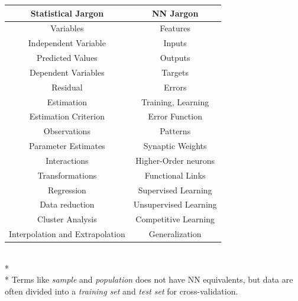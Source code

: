\documentclass[10pt,a4paper]{article}
\begin{document}
	\begin{tabular}{|c|c|}
		\hline 
		\textbf{Statistical Jargon} & \textbf{NN Jargon} \\ 
		\hline 
		Variables & Features \\ 
		\hline 
		Independent Variable & Inputs \\ 
		\hline 
		Predicted Values & Outputs \\ 
		\hline 
		Dependent Variables & Targets \\ 
		\hline 
		Residual & Errors \\ 
		\hline 
		Estimation & Training, Learning \\ 
		\hline 
		Estimation Criterion & Error Function \\ 
		\hline 
		Observations & Patterns \\ 
		\hline 
		Parameter Estimates & Synaptic Weights \\ 
		\hline 
		Interactions & Higher-Order neurons \\ 
		\hline 
		Transformations & Functional Links \\ 
		\hline 
		Regression & Supervised Learning \\ 
		\hline 
		Data reduction & Unsupervised Learning \\ 
		\hline 
		Cluster Analysis & Competitive Learning \\ 
		\hline 
		Interpolation and Extrapolation & Generalization \\ 
		\hline 
	\end{tabular} \\*\\*
	Terms like \emph{sample} and \emph{population} does not have NN equivalents, but data are often divided into a \emph{training set} and \emph{test set} for cross-validation.
\end{document}
